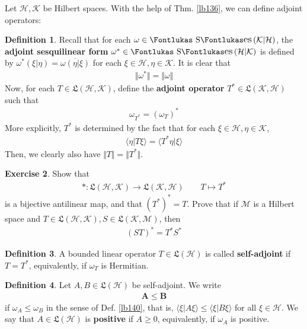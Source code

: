 \documentclass[12pt,b5paper,notitlepage]{article}
\theoremstyle{definition}
\newtheorem{df}{Definition}[subsection]
\newtheorem{exe}[df]{Exercise}
\theoremstyle{plain}
\DeclareMathOperator{\Ses}{\text{\Fontlukas S}\text{\kern -0pt {\Fontlukas\large es}}\,}
\newcommand{\fk}{\mathfrak}
\newcommand{\ovl}{\overline}
\newcommand{\bk}[1]{\langle {#1}\rangle}
\newcommand{\MH}{\mathcal H}
\newcommand{\MK}{\mathcal K}
\newcommand{\MM}{\mathcal M}
\numberwithin{equation}{section}
\begin{document}
Let $\MH,\MK$ be Hilbert spaces. With the help of Thm. \ref{lb136}, we can define adjoint operators:


\begin{df}
Recall that for each $\omega\in\Ses(\MK|\MH)$, the \textbf{adjoint sesquilinear form} $\omega^*\in\Ses(\MH|\MK)$ is defined by $\omega^*(\xi|\eta)=\ovl{\omega(\eta|\xi)}$ for each $\xi\in\MH,\eta\in\MK$. It is clear that
\begin{align*}
\Vert\omega^*\Vert=\Vert\omega\Vert
\end{align*}
Now, for each $T\in\fk L(\MH,\MK)$, define the \textbf{adjoint operator}  $T^*\in\fk L(\MK,\MH)$ such that
\begin{align*}
\omega_{T^*}=(\omega_T)^*
\end{align*}
More explicitly, $T^*$ is determined by the fact that for each $\xi\in\MH,\eta\in\MK$,
\begin{align*}
\bk{\eta|T\xi}=\bk{T^*\eta|\xi}
\end{align*}
Then, we clearly also have $\Vert T\Vert=\Vert T^*\Vert$.
\end{df}



\begin{exe}
Show that
\begin{align*}
*:\fk L(\MH,\MK)\rightarrow\fk L(\MK,\MH)\qquad T\mapsto T^*
\end{align*}
is a bijective antilinear map, and that $(T^*)^*=T$. Prove that if $\MM$ is a Hilbert space and $T\in\fk L(\MH,\MK),S\in\fk L(\MK,\MM)$, then
\begin{align*}
(ST)^*=T^*S^*
\end{align*}
\end{exe}


\begin{df}
A bounded linear operator $T\in\fk L(\MH)$ is called \textbf{self-adjoint}  if $T=T^*$, equivalently, if $\omega_T$ is Hermitian.
\end{df}


\begin{df}\label{lb247}
Let $A,B\in\fk L(\MH)$ be self-adjoint. We write
\begin{align*}
\pmb{A\leq B}
\end{align*}
if $\omega_A\leq\omega_B$ in the sense of Def. \ref{lb140}, that is, $\bk{\xi|A\xi}\leq\bk{\xi|B\xi}$ for all $\xi\in\MH$. We say that $A\in\fk L(\MH)$ is \textbf{positive}  if $A\geq0$, equivalently, if $\omega_A$ is positive. 
\end{df}
\end{document}
